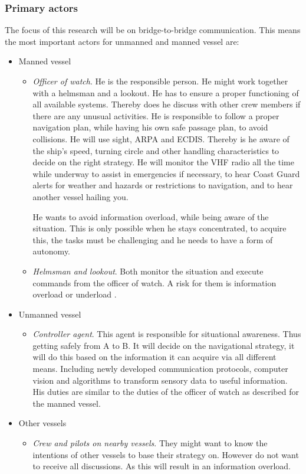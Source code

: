 \subsubsection{Primary actors}
The focus of this research will be on bridge-to-bridge communication. This means the most important actors for unmanned and manned vessel are:
\begin{itemize}
	\item Manned vessel
	\begin{itemize}
		\item \emph{Officer of watch}. He is the responsible person. He might work together with a helmsman and a lookout. He has to ensure a proper functioning of all available systems. Thereby does he discuss with other crew members if there are any unusual activities. He is responsible to follow a proper navigation plan, while having his own safe passage plan, to avoid collisions. He will use sight, \ac{ARPA} and \ac{ECDIS}. Thereby is he aware of the ship's speed, turning circle and other handling characteristics to decide on the right strategy. He will monitor the \ac{VHF} radio all the time while underway to assist in emergencies if necessary, to hear Coast Guard alerts for weather and hazards or restrictions to navigation, and to hear another vessel hailing you.
		
		He wants to avoid information overload, while being aware of the situation. This is only possible when he stays concentrated, to acquire this, the tasks must be challenging and he needs to have a form of autonomy.
	
		\item \emph{Helmsman and lookout}. Both monitor the situation and execute commands from the officer of watch. A risk for them is information overload or underload \cite{Neerincx2008}.
	\end{itemize}
		
	\item Unmanned vessel
	\begin{itemize}
		\item \emph{Controller agent}. This agent is responsible for situational awareness. Thus getting safely from A to B. It will decide on the navigational strategy, it will do this based on the information it can acquire via all different means. Including newly developed communication protocols, computer vision and algorithms to transform sensory data to useful information. His duties are similar to the duties of the officer of watch as described for the manned vessel.
	\end{itemize}

	\item Other vessels
	\begin{itemize}
		\item \emph{Crew and pilots on nearby vessels}. They might want to know the intentions of other vessels to base their strategy on. However do not want to receive all discussions. As this will result in an information overload.
	\end{itemize}
	
\end{itemize}

